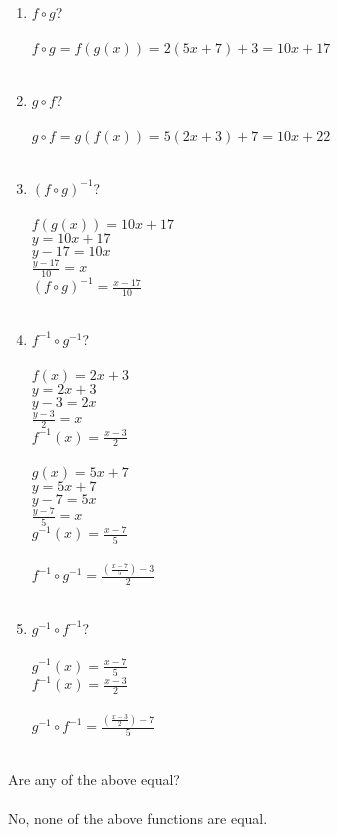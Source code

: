 \documentclass{amsart}
\theoremstyle{definition}
\theoremstyle{Exercise}
\theoremstyle{remark}
\theoremstyle{rule}
\numberwithin{equation}{section}
\begin{document}
\begin{enumerate}[label=(\alph*)]
\item  $f\circ g$?\\\\
$f \circ g = f(g(x)) = 2(5x + 7) + 3 = 10x + 17$
\\\\
\item  $g \circ f$?\\\\
$g \circ f = g(f(x)) = 5(2x + 3) + 7 = 10x + 22$
\\\\
\item  $(f\circ g)^{-1}$?\\\\
$f(g(x)) = 10x + 17$\\
$y = 10x + 17$\\
$y - 17 = 10x$\\
$\frac{y - 17}{10} = x$\\
$(f\circ g)^{-1} = \frac{x - 17}{10}$
\\\\
\item  $f^{-1}\circ g^{-1}$?\\\\
$f(x) = 2x + 3$\\
$y = 2x + 3$\\
$y - 3 = 2x$\\
$\frac{y - 3}{2} = x$\\
$f^{-1}(x) = \frac{x - 3}{2}$\\
\\
$g(x) = 5x + 7$\\
$y = 5x + 7$\\
$y - 7 = 5x$\\
$\frac{y - 7}{5} = x$\\
$g^{-1}(x) = \frac{x - 7}{5}$\\
\\
$f^{-1}\circ g^{-1} = \frac{(\frac{x - 7}{5}) - 3}{2}$
\\\\
\item  $g^{-1}\circ f^{-1}$?\\\\
$g^{-1}(x) = \frac{x - 7}{5}$\\
$f^{-1}(x) = \frac{x - 3}{2}$\\
\\
$g^{-1}\circ f^{-1} = \frac{(\frac{x - 3}{2}) - 7}{5}$
\\\\
\end{enumerate}
Are any of the above equal?\\\\
No, none of the above functions are equal.
\\\\
\end{document}
